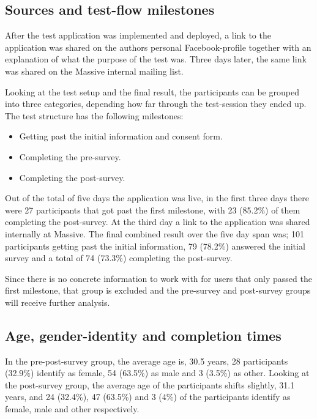 \documentclass[nofilelist,dvipsnames]{cslthse-msc}
\begin{document}
{    \subsection{Sources and test-flow milestones}

      After the test application was implemented and deployed, a link to the
      application was shared on the authors personal Facebook-profile together
      with an explanation of what the purpose of the test was. Three days
      later, the same link was shared on the Massive internal mailing list.

      Looking at the test setup and the final result, the participants can be
      grouped into three categories, depending how far through the test-session
      they ended up. The test structure has the following milestones:
      \begin{itemize}
        \item{Getting past the initial information and consent form.}
        \item{Completing the pre-survey.}
        \item{Completing the post-survey.}
      \end{itemize}

      Out of the total of five days the application was live, in the first
      three days there were 27 participants that got past the first milestone,
      with 23 (85.2\%) of them completing the post-survey. At the third day a
      link to the application was shared internally at Massive. The final
      combined result over the five day span was; 101 participants getting past
      the initial information, 79 (78.2\%) answered the initial survey and a
      total of 74 (73.3\%) completing the post-survey.

      Since there is no concrete information to work with for users that only
      passed the first milestone, that group is excluded and the pre-survey and
      post-survey groups will receive further analysis.

      \subsection{Age, gender-identity and completion times}

      In the pre-post-survey group, the average age is, 30.5 years, 28
      participants (32.9\%) identify as female, 54 (63.5\%) as male and 3
      (3.5\%) as other. Looking at the post-survey group, the average age of
      the participants shifts slightly, 31.1 years, and 24 (32.4\%), 47
      (63.5\%) and 3 (4\%) of the participants identify as female, male and
      other respectively.

}
\end{document}
